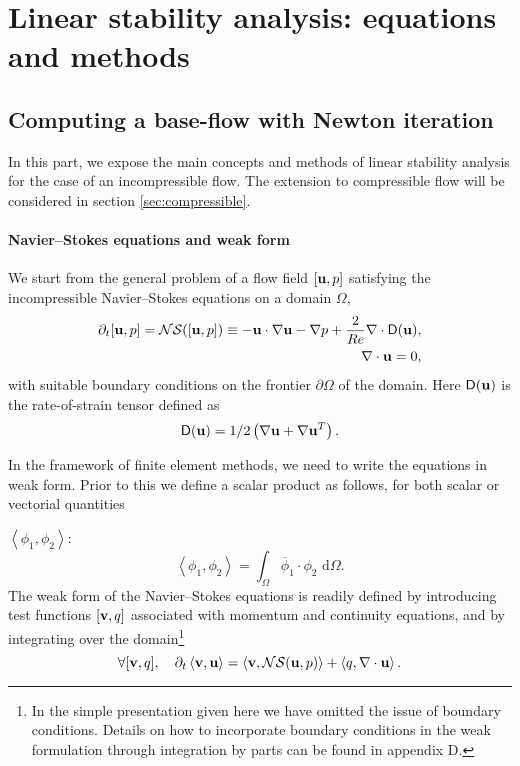 \documentclass[twocolumn,10pt]{asme2ej}
\newcommand{\be}[1]{ \begin{equation} \label{#1}}
\newcommand{\ee}{\end{equation}}
\begin{document}

\section{Linear stability analysis: equations and methods}
\vspace{.2cm}


\subsection{Computing a base-flow with Newton iteration}
\vspace{.2cm}

In this part, we expose the main concepts and methods of linear stability analysis for the case of an incompressible flow.
The extension to compressible flow will be considered in section \ref{sec:compressible}.



\paragraph{Navier--Stokes equations and weak form}

We start from the general problem of a flow field $[{\bf u},p]$ satisfying the incompressible Navier--Stokes equations on a domain $\Omega$,
\begin{eqnarray} \label{NSprimitive}
\partial_t  [{\bf u},p] = {\cal NS} ( [{\bf u},p] )
\equiv - {\bf u} \cdot \nabla {\bf u} - \nabla p + \frac{2}{Re}  \nabla \cdot {\mathsf{D}}({\bf u}),  \\
\nabla \cdot {\bf u} = 0,
\end{eqnarray}
with suitable boundary conditions on the frontier $\partial \Omega$ of the domain.
Here $ {\mathsf{D}}({\bf u}) $ is the rate-of-strain tensor defined as
$$
 {\mathsf{D}}({\bf u}) = 1/2
\left( \nabla {\bf u} +  \nabla {\bf u}^T  \right).
$$ 

In the framework of finite element methods, we need to write the equations in weak form.
Prior to this we define a scalar product as follows, for both scalar or vectorial quantities 

$\left< \phi_1, \phi_2 \right> $:
$$
\left< \phi_1, \phi_2 \right> = \int_\Omega \overline{\phi}_1 \cdot \phi_2   \mbox{ d} \Omega.
$$
The weak form of the Navier--Stokes equations is readily defined by introducing test functions 
$[{\bf v},q]$ associated with momentum and continuity equations, and by integrating over the domain\footnote{In the simple presentation given here we have omitted the issue of boundary conditions. Details on how to incorporate boundary conditions in the weak formulation through integration by parts can be found in appendix D.}
\be{NSweak}
\forall [{\bf v},q], \quad \partial_t \left< {\bf v}, {\bf u}\right> = \left< {\bf v} , {\cal NS} ({\bf u},p) \right> + \left< q, \nabla \cdot {\bf u}\right>.
\ee
\end{document}
